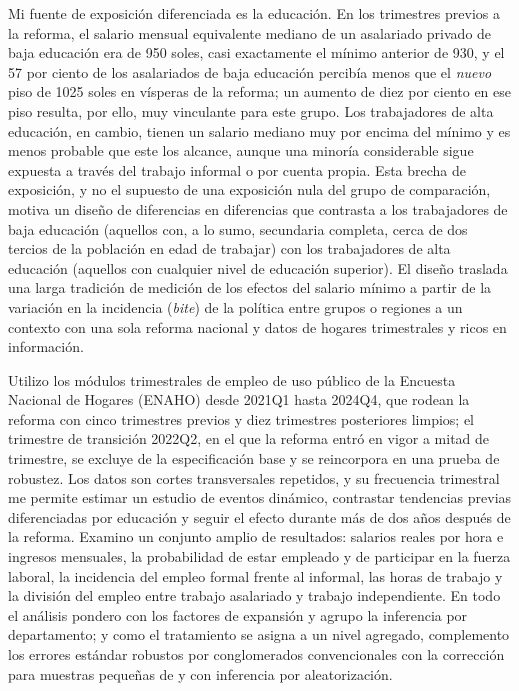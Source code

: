 Mi fuente de exposición diferenciada es la educación. En los trimestres previos a la reforma, el salario mensual equivalente mediano de un asalariado privado de baja educación era de 950 soles, casi exactamente el mínimo anterior de 930, y el 57 por ciento de los asalariados de baja educación percibía menos que el \emph{nuevo} piso de 1025 soles en vísperas de la reforma; un aumento de diez por ciento en ese piso resulta, por ello, muy vinculante para este grupo. Los trabajadores de alta educación, en cambio, tienen un salario mediano muy por encima del mínimo y es menos probable que este los alcance, aunque una minoría considerable sigue expuesta a través del trabajo informal o por cuenta propia. Esta brecha de exposición, y no el supuesto de una exposición nula del grupo de comparación, motiva un diseño de diferencias en diferencias que contrasta a los trabajadores de baja educación (aquellos con, a lo sumo, secundaria completa, cerca de dos tercios de la población en edad de trabajar) con los trabajadores de alta educación (aquellos con cualquier nivel de educación superior). El diseño traslada una larga tradición de medición de los efectos del salario mínimo a partir de la variación en la incidencia (\emph{bite}) de la política entre grupos o regiones \citep{card_1992, lee_1999, machin_manning_rahman_2003} a un contexto con una sola reforma nacional y datos de hogares trimestrales y ricos en información.

Utilizo los módulos trimestrales de empleo de uso público de la Encuesta Nacional de Hogares (ENAHO) desde 2021Q1 hasta 2024Q4, que rodean la reforma con cinco trimestres previos y diez trimestres posteriores limpios; el trimestre de transición 2022Q2, en el que la reforma entró en vigor a mitad de trimestre, se excluye de la especificación base y se reincorpora en una prueba de robustez. Los datos son cortes transversales repetidos, y su frecuencia trimestral me permite estimar un estudio de eventos dinámico, contrastar tendencias previas diferenciadas por educación y seguir el efecto durante más de dos años después de la reforma. Examino un conjunto amplio de resultados: salarios reales por hora e ingresos mensuales, la probabilidad de estar empleado y de participar en la fuerza laboral, la incidencia del empleo formal frente al informal, las horas de trabajo y la división del empleo entre trabajo asalariado y trabajo independiente. En todo el análisis pondero con los factores de expansión y agrupo la inferencia por departamento; y como el tratamiento se asigna a un nivel agregado, complemento los errores estándar robustos por conglomerados convencionales con la corrección para muestras pequeñas de \citet{pustejovsky_tipton_2018} y con inferencia por aleatorización.

